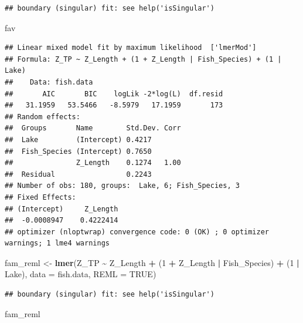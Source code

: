 \documentclass[
]{article}
\newenvironment{Shaded}{\begin{snugshade}}{\end{snugshade}}
\newcommand{\AttributeTok}[1]{\textcolor[rgb]{0.13,0.29,0.53}{#1}}
\newcommand{\ConstantTok}[1]{\textcolor[rgb]{0.56,0.35,0.01}{#1}}
\newcommand{\DecValTok}[1]{\textcolor[rgb]{0.00,0.00,0.81}{#1}}
\newcommand{\FunctionTok}[1]{\textcolor[rgb]{0.13,0.29,0.53}{\textbf{#1}}}
\newcommand{\NormalTok}[1]{#1}
\newcommand{\OtherTok}[1]{\textcolor[rgb]{0.56,0.35,0.01}{#1}}
\newcommand{\SpecialCharTok}[1]{\textcolor[rgb]{0.81,0.36,0.00}{\textbf{#1}}}
\begin{document}
\begin{verbatim}
## boundary (singular) fit: see help('isSingular')
\end{verbatim}

\begin{Shaded}
\begin{Highlighting}[]
\NormalTok{fav}
\end{Highlighting}
\end{Shaded}

\begin{verbatim}
## Linear mixed model fit by maximum likelihood  ['lmerMod']
## Formula: Z_TP ~ Z_Length + (1 + Z_Length | Fish_Species) + (1 | Lake)
##    Data: fish.data
##       AIC       BIC    logLik -2*log(L)  df.resid 
##   31.1959   53.5466   -8.5979   17.1959       173 
## Random effects:
##  Groups       Name        Std.Dev. Corr
##  Lake         (Intercept) 0.4217       
##  Fish_Species (Intercept) 0.7650       
##               Z_Length    0.1274   1.00
##  Residual                 0.2243       
## Number of obs: 180, groups:  Lake, 6; Fish_Species, 3
## Fixed Effects:
## (Intercept)     Z_Length  
##  -0.0008947    0.4222414  
## optimizer (nloptwrap) convergence code: 0 (OK) ; 0 optimizer warnings; 1 lme4 warnings
\end{verbatim}

\begin{Shaded}
\begin{Highlighting}[]
\NormalTok{fam\_reml }\OtherTok{\textless{}{-}} \FunctionTok{lmer}\NormalTok{(Z\_TP }\SpecialCharTok{\textasciitilde{}}\NormalTok{ Z\_Length }\SpecialCharTok{+}\NormalTok{ (}\DecValTok{1} \SpecialCharTok{+}\NormalTok{ Z\_Length }\SpecialCharTok{|}\NormalTok{ Fish\_Species) }\SpecialCharTok{+}\NormalTok{ (}\DecValTok{1} \SpecialCharTok{|}\NormalTok{ Lake),}
           \AttributeTok{data =}\NormalTok{ fish.data, }\AttributeTok{REML =} \ConstantTok{TRUE}\NormalTok{)}
\end{Highlighting}
\end{Shaded}

\begin{verbatim}
## boundary (singular) fit: see help('isSingular')
\end{verbatim}

\begin{Shaded}
\begin{Highlighting}[]
\NormalTok{fam\_reml}
\end{Highlighting}
\end{Shaded}
\end{document}
